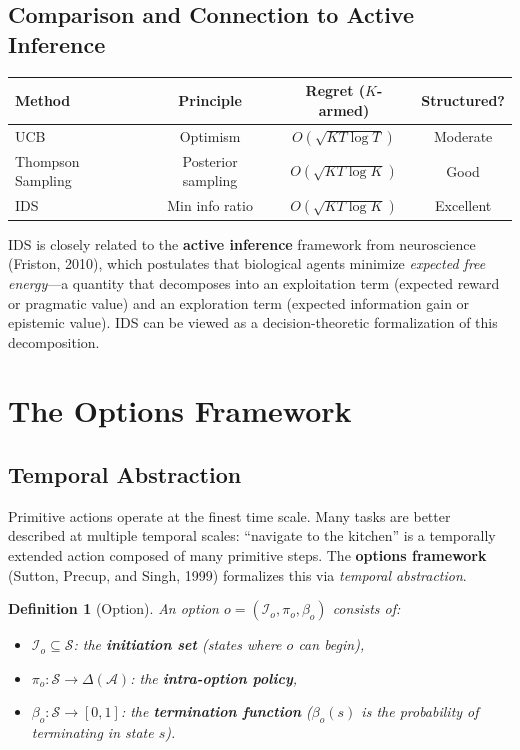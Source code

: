 \documentclass[11pt,a4paper]{article}
\newtheorem{definition}[theorem]{Definition}
\newcommand{\cS}{\mathcal{S}}
\newcommand{\cA}{\mathcal{A}}
\newcommand{\cI}{\mathcal{I}}
\begin{document}
\subsection{Comparison and Connection to Active Inference}

\begin{center}
\begin{tabular}{lccc}
  \toprule
  \textbf{Method} & \textbf{Principle} & \textbf{Regret ($K$-armed)} & \textbf{Structured?} \\
  \midrule
  UCB & Optimism & $O(\sqrt{KT \log T})$ & Moderate \\
  Thompson Sampling & Posterior sampling & $O(\sqrt{KT \log K})$ & Good \\
  IDS & Min info ratio & $O(\sqrt{KT \log K})$ & Excellent \\
  \bottomrule
\end{tabular}
\end{center}

IDS is closely related to the \textbf{active inference} framework from neuroscience
(Friston, 2010), which postulates that biological agents minimize \emph{expected free energy}---a
quantity that decomposes into an exploitation term (expected reward or pragmatic value)
and an exploration term (expected information gain or epistemic value). IDS can be
viewed as a decision-theoretic formalization of this decomposition.


\section{The Options Framework}
\label{sec:options}

\subsection{Temporal Abstraction}

Primitive actions operate at the finest time scale. Many tasks are better
described at multiple temporal scales: ``navigate to the kitchen'' is a
temporally extended action composed of many primitive steps. The
\textbf{options framework} (Sutton, Precup, and Singh, 1999) formalizes
this via \emph{temporal abstraction}.

\begin{definition}[Option]
An option $o = (\cI_o, \pi_o, \beta_o)$ consists of:
\begin{itemize}[nosep]
  \item $\cI_o \subseteq \cS$: the \textbf{initiation set} (states where $o$ can begin),
  \item $\pi_o : \cS \to \Delta(\cA)$: the \textbf{intra-option policy},
  \item $\beta_o : \cS \to [0, 1]$: the \textbf{termination function}
    ($\beta_o(s)$ is the probability of terminating in state $s$).
\end{itemize}
\end{definition}
\end{document}

